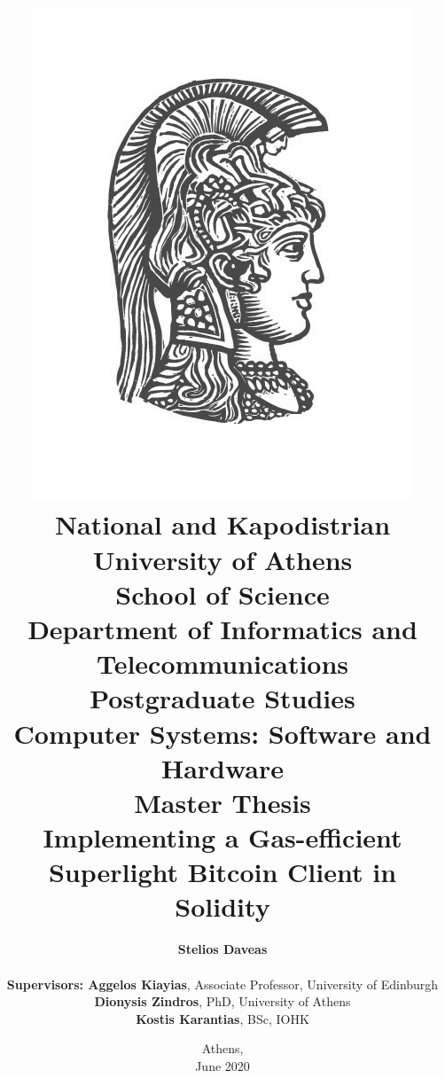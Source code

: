 \title{
    {\includegraphics[scale=0.8]{figures/logo_uoa.jpg}}\\
    {\large National and Kapodistrian University of Athens \\
    School of Science \\
    Department of Informatics and Telecommunications}\\
    \vspace{1cm}
    Postgraduate Studies \\
    Computer Systems: Software and Hardware\\
    \vspace{5mm}
    {Master Thesis}\\
    \vspace{3mm}
    {\textbf{\LARGE Implementing a Gas-efficient\\Superlight Bitcoin Client in Solidity}}
    }

\author{
    \textbf{Stelios Daveas} \\
    \vspace{1cm} \\
    \textbf{Supervisors: Aggelos Kiayias}, Associate Professor, University of Edinburgh\\
    \hspace{-0.60cm}
    \textbf{Dionysis Zindros}, PhD, University of Athens\\
    \hspace{-3.70cm}
    \textbf{Kostis Karantias}, BSc, IOHK
}

\date{Athens, \\ June 2020}
